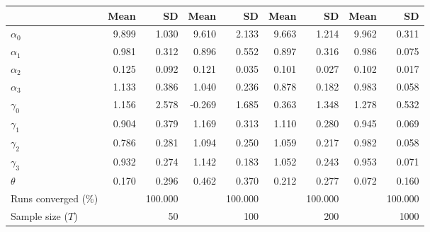 
\begin{tabular}[t]{lrrrrrrrr}
\toprule
  & Mean & SD & Mean  & SD  & Mean   & SD   & Mean    & SD   \\
\midrule
$\alpha_{0}$ & 9.899 & 1.030 & 9.610 & 2.133 & 9.663 & 1.214 & 9.962 & 0.311\\
$\alpha_{1}$ & 0.981 & 0.312 & 0.896 & 0.552 & 0.897 & 0.316 & 0.986 & 0.075\\
$\alpha_{2}$ & 0.125 & 0.092 & 0.121 & 0.035 & 0.101 & 0.027 & 0.102 & 0.017\\
$\alpha_{3}$ & 1.133 & 0.386 & 1.040 & 0.236 & 0.878 & 0.182 & 0.983 & 0.058\\
$\gamma_{0}$ & 1.156 & 2.578 & -0.269 & 1.685 & 0.363 & 1.348 & 1.278 & 0.532\\
$\gamma_{1}$ & 0.904 & 0.379 & 1.169 & 0.313 & 1.110 & 0.280 & 0.945 & 0.069\\
$\gamma_{2}$ & 0.786 & 0.281 & 1.094 & 0.250 & 1.059 & 0.217 & 0.982 & 0.058\\
$\gamma_{3}$ & 0.932 & 0.274 & 1.142 & 0.183 & 1.052 & 0.243 & 0.953 & 0.071\\
$\theta$ & 0.170 & 0.296 & 0.462 & 0.370 & 0.212 & 0.277 & 0.072 & 0.160\\
Runs converged (\%) &  & 100.000 &  & 100.000 &  & 100.000 &  & 100.000\\
Sample size ($T$) &  & 50 &  & 100 &  & 200 &  & 1000\\
\bottomrule
\end{tabular}
